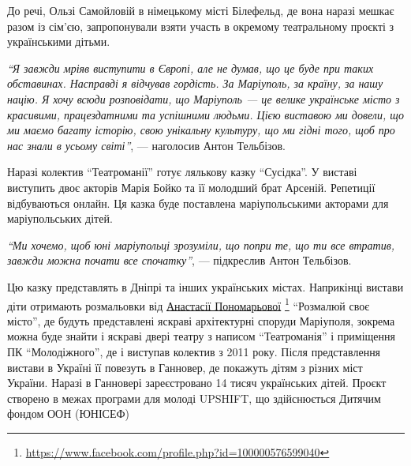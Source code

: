 До речі, Ользі Самойловій в німецькому місті Білефельд, де вона наразі мешкає
разом із сім'єю, запропонували взяти участь в окремому театральному проєкті з
українськими дітьми.

\begin{leftbar}
  \begingroup
\emph{\enquote{Я завжди мріяв виступити в Європі, але не думав, що це буде при таких
обставинах. Насправді я відчував гордість. За Маріуполь, за країну, за нашу
націю. Я хочу всюди розповідати, що Маріуполь — це велике українське місто з
красивими, працездатними та успішними людьми. Цією виставою ми довели, що ми
маємо багату історію, свою унікальну культуру, що ми гідні того, щоб про нас
знали в усьому світі}}, — наголосив Антон Тельбізов.
   \endgroup
\end{leftbar}


Наразі колектив \enquote{Театроманії} готує лялькову казку \enquote{Сусідка}. У виставі
виступить двоє акторів Марія Бойко та її молодший брат Арсеній. Репетиції
відбуваються онлайн. Ця казка буде поставлена маріупольськими акторами для
маріупольських дітей.

\begin{leftbar}
  \begingroup
\emph{\enquote{Ми хочемо, щоб юні маріупольці зрозуміли, що попри те, що ти все
втратив, завжди можна почати все спочатку}}, — підкреслив Антон
Тельбізов. 
   \endgroup
\end{leftbar}


Цю казку представлять в Дніпрі та інших українських містах. Наприкінці вистави
діти отримають розмальовки від \href{https://www.facebook.com/profile.php?id=100000576599040}{Анастасії Пономарьової}%
\footnote{\url{https://www.facebook.com/profile.php?id=100000576599040}}
\enquote{Розмалюй своє місто}, де
будуть представлені яскраві архітектурні споруди Маріуполя, зокрема можна буде
знайти і яскраві двері театру з написом \enquote{Театроманія} і приміщення ПК
\enquote{Молодіжного}, де і виступав колектив з 2011 року. Після представлення вистави
в Україні її повезуть в Ганновер, де покажуть дітям з різних міст України.
Наразі в Ганновері зареєстровано 14 тисяч українських дітей. Проєкт створено в
межах програми для молоді UPSHIFT, що здійснюється Дитячим фондом ООН (ЮНІСЕФ)

